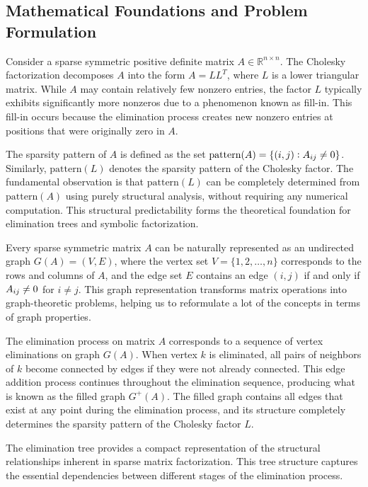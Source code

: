 \subsection{Mathematical Foundations and Problem Formulation}

Consider a sparse symmetric positive definite matrix $A \in \mathbb{R}^{n \times n}$. The Cholesky factorization decomposes $A$ into the form $A = LL^T$, where $L$ is a lower triangular matrix. While $A$ may contain relatively few nonzero entries, the factor $L$ typically exhibits significantly more nonzeros due to a phenomenon known as fill-in. This fill-in occurs because the elimination process creates new nonzero entries at positions that were originally zero in $A$.

The sparsity pattern of $A$ is defined as the set $\text{pattern}(A) = \{(i,j) : A\sb{ij} \neq 0\}$. Similarly, $\text{pattern}(L)$ denotes the sparsity pattern of the Cholesky factor. The fundamental observation is that $\text{pattern}(L)$ can be completely determined from $\text{pattern}(A)$ using purely structural analysis, without requiring any numerical computation. This structural predictability forms the theoretical foundation for elimination trees and symbolic factorization.

Every sparse symmetric matrix $A$ can be naturally represented as an undirected graph $G(A) = (V, E)$, where the vertex set $V = \{1, 2, \ldots, n\}$ corresponds to the rows and columns of $A$, and the edge set $E$ contains an edge $(i,j)$ if and only if $A\sb{ij} \neq 0$ for $i \neq j$. This graph representation transforms matrix operations into graph-theoretic problems, helping us to reformulate a lot of the concepts in terms of graph properties.

The elimination process on matrix $A$ corresponds to a sequence of vertex eliminations on graph $G(A)$. When vertex $k$ is eliminated, all pairs of neighbors of $k$ become connected by edges if they were not already connected. This edge addition process continues throughout the elimination sequence, producing what is known as the filled graph $G^+(A)$. The filled graph contains all edges that exist at any point during the elimination process, and its structure completely determines the sparsity pattern of the Cholesky factor $L$.

The elimination tree provides a compact representation of the structural relationships inherent in sparse matrix factorization. This tree structure captures the essential dependencies between different stages of the elimination process.

